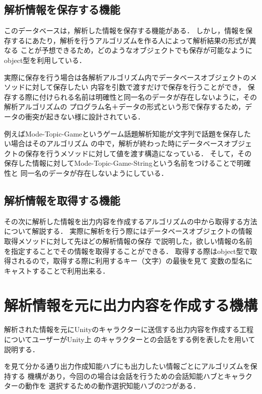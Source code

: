 \subsection{解析情報を保存する機能}
このデータベースは，解析した情報を保存する機能がある．
しかし，情報を保存するにあたり，解析を行うアルゴリズムを作る人によって解析結果の形式が異なる
ことが予想できるため，どのようなオブジェクトでも保存が可能なようにobject型を利用している．

実際に保存を行う場合は各解析アルゴリズム内でデータベースオブジェクトのメソッドに対して保存したい
内容を引数で渡すだけで保存を行うことができ，
保存する際に付けられる名前は明確性と同一名のデータが存在しないように，その解析アルゴリズムの
プログラム名＋データの形式という形で保存するため，データの衝突が起きない様に設計されている．

例えばMode-Topic-Gameというゲーム話題解析知能が文字列で話題を保存したい場合はそのアルゴリズム
の中で，解析が終わった時にデータベースオブジェクトの保存を行うメソッドに対して値を渡す構造になっている．
そして，その保存した情報に対してMode-Topic-Game-Stringという名前をつけることで明確性と
同一名のデータが存在しないようにしている．

\subsection{解析情報を取得する機能}
その次に解析した情報を出力内容を作成するアルゴリズムの中から取得する方法について解説する．
実際に解析を行う際にはデータベースオブジェクトの情報取得メソッドに対して先ほどの解析情報の保存
で説明した，欲しい情報の名前を指定することでその情報を取得することができる．
取得する際はobject型で取得されるので，取得する際に利用するキー（文字）の最後を見て
変数の型名にキャストすることで利用出来る．

\newpage

\section{解析情報を元に出力内容を作成する機構}
解析された情報を元にUnityのキャラクターに送信する出力内容を作成する工程についてユーザーがUnity上
のキャラクターとの会話をする例を表したを用いて説明する．


を見て分かる通り出力作成知能ハブにも出力したい情報ごとにアルゴリズムを保持する
機構があり，今回のの場合は会話を行うための会話知能ハブとキャラクターの動作を
選択するための動作選択知能ハブの2つがある．

